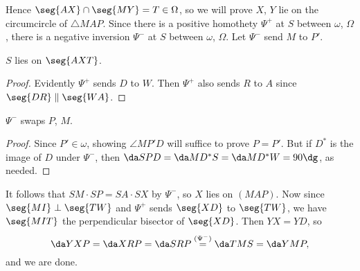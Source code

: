 Hence $\seg{AX}\cap\seg{MY}=T\in\Omega$, so we will prove $X$, $Y$ lie on the circumcircle of $\triangle MAP$. Since there is a positive homothety $\Psi^+$ at $S$ between $\omega$, $\Omega$, there is a negative inversion $\Psi^-$ at $S$ between $\omega$, $\Omega$. Let $\Psi^-$ send $M$ to $P'$.
\begin{claim}
    $S$ lies on $\seg{AXT}$.
\end{claim}
\begin{proof}
    Evidently $\Psi^+$ sends $D$ to $W$. Then $\Psi^+$ also sends $R$ to $A$ since $\seg{DR}\parallel\seg{WA}$.
\end{proof}
\begin{claim}
    $\Psi^-$ swaps $P$, $M$.
\end{claim}
\begin{proof}
    Since $P'\in\omega$, showing $\angle MP'D$ will suffice to prove $P=P'$. But if $D^*$ is the image of $D$ under $\Psi^-$, then $\da SPD=\da MD^*S=\da MD^*W=90\dg$, as needed.
\end{proof}

It follows that $SM\cdot SP=SA\cdot SX$ by $\Psi^-$, so $X$ lies on $(MAP)$. Now since $\seg{MI}\perp\seg{TW}$ and $\Psi^+$ sends $\seg{XD}$ to $\seg{TW}$, we have $\seg{MIT}$ the perpendicular bisector of $\seg{XD}$. Then $YX=YD$, so \[\da YXP=\da XRP=\da SRP\stackrel{(\Psi^-)}=\da TMS=\da YMP,\]
and we are done.

